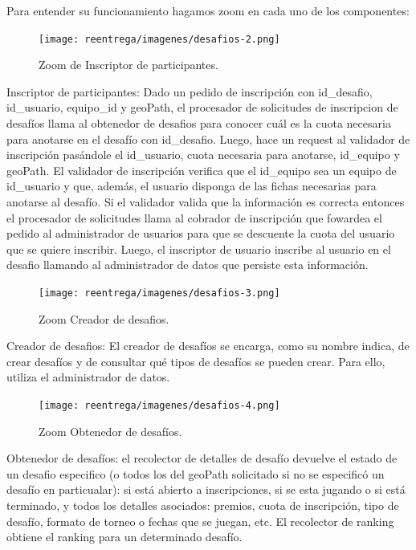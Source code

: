 Para entender su funcionamiento hagamos zoom en cada uno de los componentes:

\begin{figure}[H]
   \centering
   \texttt{[image: reentrega/imagenes/desafios-2.png]}
   \caption{Zoom de Inscriptor de participantes.}
\end{figure}

Inscriptor de participantes: Dado un pedido de inscripción con id_desafio, id_usuario, equipo_id y geoPath, el procesador de solicitudes de inscripcion de desafíos llama al
obtenedor de desafios para conocer cuál es la cuota necesaria para anotarse en el desafío con id_desafio. Luego, hace un request al validador de inscripción pasándole el id_usuario, cuota
necesaria para anotarse, id_equipo y geoPath. El validador de inscripción verifica que el id_equipo sea un equipo de id_usuario y que, además, el usuario disponga de las fichas necesarias
para anotarse al desafío. Si el validador valida que la información es correcta entonces el procesador de solicitudes llama al cobrador de inscripción que fowardea el pedido al administrador de usuarios para que se descuente la cuota del usuario que se quiere inscribir. Luego, el inscriptor de usuario inscribe al usuario en el desafio llamando al administrador
de datos que persiste esta información.

\begin{figure}[H]
  \centering
  \texttt{[image: reentrega/imagenes/desafios-3.png]}
  \caption{Zoom Creador de desafios.}
\end{figure}

Creador de desafios: El creador de desafíos se encarga, como su nombre indica, de crear desafíos y de consultar qué tipos de desafíos se pueden crear. Para ello, utiliza el administrador de
datos.

\begin{figure}[H]
  \centering
  \texttt{[image: reentrega/imagenes/desafios-4.png]}
  \caption{Zoom Obtenedor de desafíos.}
\end{figure}

Obtenedor de desafíos: el recolector de detalles de desafío devuelve el estado de un desafio especifico (o todos los del geoPath solicitado si no se especificó un desafío en particualar): si está abierto a inscripciones, si se esta jugando o si está terminado, y todos los detalles asociados: premios, cuota de inscripción, tipo de desafío, formato de torneo o fechas que se juegan, etc. El recolector de ranking obtiene el ranking para un determinado desafío.


